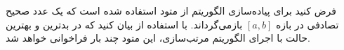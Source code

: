 فرض کنید برای پیاده‌سازی الگوریتم   از متود  استفاده شده است که یک عدد صحیح تصادفی در بازه $[a,b]$ بازمی‌گرداند. با استفاده از  بیان کنید که در بدترین و بهترین حالت با اجرای الگوریتم مرتب‌سازی، این متود چند بار فراخوانی خواهد شد.